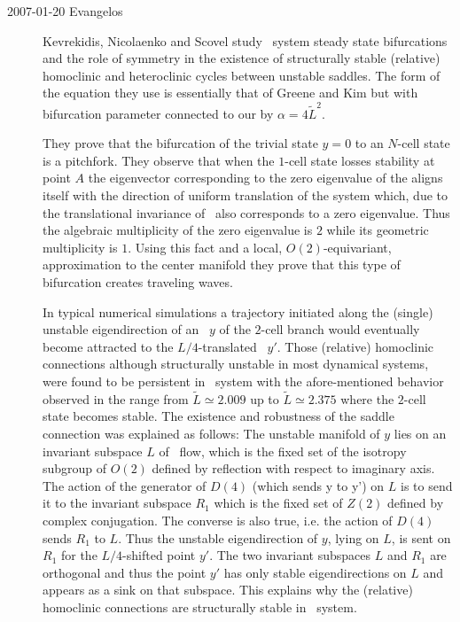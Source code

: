\begin{description}

\item[2007-01-20 Evangelos]
Kevrekidis, Nicolaenko and Scovel study \KS\ system
steady state bifurcations and the role of symmetry in the
existence of structurally stable (relative) homoclinic and
heteroclinic cycles between unstable saddles. The form  of
the equation they use is essentially that of Greene and Kim but
with bifurcation parameter connected to our by
$\alpha=4\tilde{L}^2$.


They prove that the bifurcation of the trivial state $y=0$ to
an $N$-cell state is a pitchfork. They observe that when the
$1$-cell state losses stability at point $A$ the eigenvector
corresponding to the zero eigenvalue of the {\stabmat}
aligns itself with the direction of uniform translation of the
system which, due to the translational invariance of \KSe\,
also corresponds to a zero eigenvalue. Thus the algebraic
multiplicity of the zero eigenvalue is $2$ while its geometric
multiplicity is $1$. Using this fact and a local,
$O(2)$-equivariant, approximation to the center manifold they
prove that this type of bifurcation creates traveling waves.

In typical numerical simulations  a trajectory initiated along
the (single) unstable eigendirection of an \eqv\ $y$ of
the $2$-cell branch would eventually become attracted to the
$L/4$-translated \eqv\ $y'$. Those (relative) homoclinic
connections
although structurally unstable in most dynamical systems, were
found to be persistent in \KS\ system with the afore-mentioned
behavior observed in the range from $\tilde{L}\simeq 2.009$ up
to $\tilde{L}\simeq 2.375$  where the $2$-cell state becomes
stable. The existence and robustness of the saddle connection
was explained as follows:  The unstable
manifold of $y$ lies on an invariant subspace $L$ of \KS\ flow,
which is the fixed set of the isotropy subgroup of $O(2)$
defined by reflection with respect to imaginary axis. The
action of the generator of $D(4)$ (which sends y to y') on $L$
is to send it to the invariant subspace $R_{1}$ which is the
fixed set of $Z(2)$ defined by complex conjugation. The
converse is also true, i.e. the action of $D(4)$ sends $R_{1}$
to $L$. Thus the unstable eigendirection of $y$, lying on $L$,
is sent on $R_{1}$ for the $L/4$-shifted point $y'$. The two
invariant subspaces $L$ and $R_{1}$ are orthogonal and thus the
point $y'$ has only stable eigendirections on $L$ and appears
as a sink on that subspace. This explains why the (relative)
homoclinic connections are structurally stable in \KS\ system.


\end{description}
